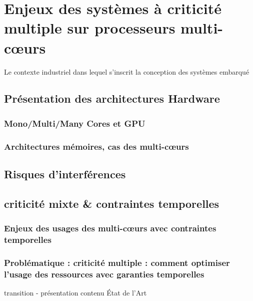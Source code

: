 \documentclass[french, a4paper, 11pt, twoside, pdftex]{StyleThese}
\begin{document}
\setcounter{chapter}{1}
\dominitoc
\faketableofcontents
\fi

\chapter{Enjeux des systèmes à criticité multiple sur processeurs multi-c\oe{}urs}
\minitoc

Le contexte industriel dans lequel s'inscrit la conception des systèmes embarqué 

\section{Présentation des architectures Hardware}
    \subsection{Mono/Multi/Many Cores et GPU}
    \subsection{Architectures mémoires, cas des multi-c\oe{}urs}
\section{Risques d'interférences}
\section{criticité mixte \& contraintes temporelles}
    \subsection{Enjeux des usages des multi-c\oe{}urs avec contraintes temporelles}
    \subsection{Problématique :  criticité multiple : comment optimiser l'usage des ressources avec garanties temporelles}
transition - présentation contenu État de l'Art


\ifdefined{}
\else


\end{document}
